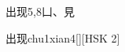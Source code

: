 \begin{entry}{出现}{5,8}{⼐、⾒}
  \begin{phonetics}{出现}{chu1xian4}[][HSK 2]
  \end{phonetics}
\end{entry}
